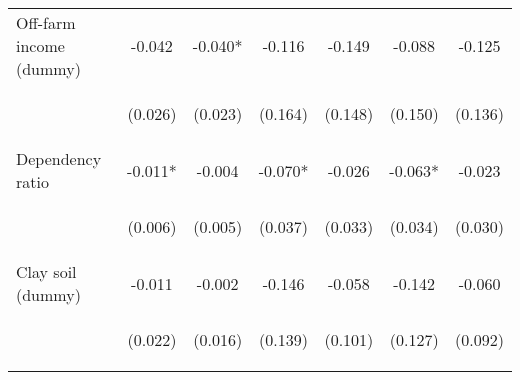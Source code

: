 \begin{center}
\begin{tabular}{lcccccc}
Off-farm income (dummy) & -0.042 & -0.040* & -0.116 & -0.149 & -0.088 & -0.125 \\
\vspace{4pt} & \begin{footnotesize}(0.026)\end{footnotesize} & \begin{footnotesize}(0.023)\end{footnotesize} & \begin{footnotesize}(0.164)\end{footnotesize} & \begin{footnotesize}(0.148)\end{footnotesize} & \begin{footnotesize}(0.150)\end{footnotesize} & \begin{footnotesize}(0.136)\end{footnotesize} \\
Dependency ratio & -0.011* & -0.004 & -0.070* & -0.026 & -0.063* & -0.023 \\
\vspace{4pt} & \begin{footnotesize}(0.006)\end{footnotesize} & \begin{footnotesize}(0.005)\end{footnotesize} & \begin{footnotesize}(0.037)\end{footnotesize} & \begin{footnotesize}(0.033)\end{footnotesize} & \begin{footnotesize}(0.034)\end{footnotesize} & \begin{footnotesize}(0.030)\end{footnotesize} \\
Clay soil (dummy) & -0.011 & -0.002 & -0.146 & -0.058 & -0.142 & -0.060 \\
\vspace{4pt} & \begin{footnotesize}(0.022)\end{footnotesize} & \begin{footnotesize}(0.016)\end{footnotesize} & \begin{footnotesize}(0.139)\end{footnotesize} & \begin{footnotesize}(0.101)\end{footnotesize} & \begin{footnotesize}(0.127)\end{footnotesize} & \begin{footnotesize}(0.092)\end{footnotesize} \\

\end{tabular}
\end{center}
